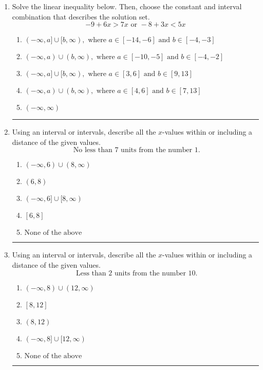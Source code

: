 \documentclass[14pt]{extbook}
\newcommand{\litem}[1]{\item#1\hspace*{-1cm}\rule{\textwidth}{0.4pt}}
\begin{document}
\begin{enumerate}
\litem{
Solve the linear inequality below. Then, choose the constant and interval combination that describes the solution set.\[ -9 + 6 x > 7 x \text{ or } -8 + 3 x < 5 x \]\begin{enumerate}[label=\Alph*.]
\item \( (-\infty, a] \cup [b, \infty), \text{ where } a \in [-14, -6] \text{ and } b \in [-4, -3] \)
\item \( (-\infty, a) \cup (b, \infty), \text{ where } a \in [-10, -5] \text{ and } b \in [-4, -2] \)
\item \( (-\infty, a] \cup [b, \infty), \text{ where } a \in [3, 6] \text{ and } b \in [9, 13] \)
\item \( (-\infty, a) \cup (b, \infty), \text{ where } a \in [4, 6] \text{ and } b \in [7, 13] \)
\item \( (-\infty, \infty) \)

\end{enumerate} }
\litem{
Using an interval or intervals, describe all the $x$-values within or including a distance of the given values.\[ \text{ No less than } 7 \text{ units from the number } 1. \]\begin{enumerate}[label=\Alph*.]
\item \( (-\infty, 6) \cup (8, \infty) \)
\item \( (6, 8) \)
\item \( (-\infty, 6] \cup [8, \infty) \)
\item \( [6, 8] \)
\item \( \text{None of the above} \)

\end{enumerate} }
\litem{
Using an interval or intervals, describe all the $x$-values within or including a distance of the given values.\[ \text{ Less than } 2 \text{ units from the number } 10. \]\begin{enumerate}[label=\Alph*.]
\item \( (-\infty, 8) \cup (12, \infty) \)
\item \( [8, 12] \)
\item \( (8, 12) \)
\item \( (-\infty, 8] \cup [12, \infty) \)
\item \( \text{None of the above} \)


\end{enumerate}}
\end{enumerate}
\end{document}

